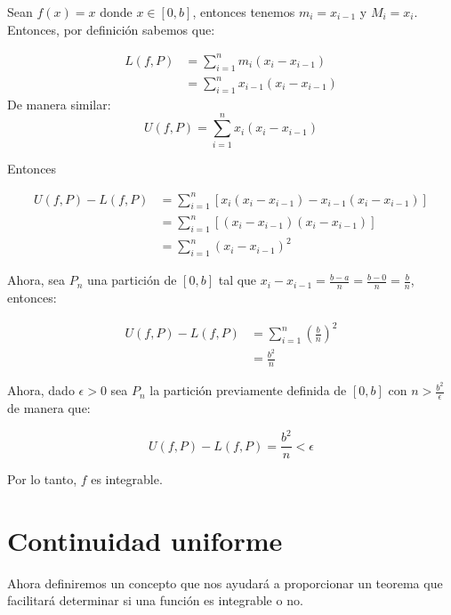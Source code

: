 \documentclass{report}
\begin{document}
    \begin{Example}
        Sean $f(x) = x$ donde $x \in [0,b]$, entonces tenemos $m_i = x_{i-1}$ y $M_i = x_i$. Entonces, por definición sabemos que:

        \begin{align*}
            L(f, P) &= \sum_{i=1}^{n} m_{i}(x_{i} - x_{i-1})\\
            &= \sum_{i=1}^{n}x_{i-1}(x_{i} - x_{i-1})
        \end{align*}
        De manera similar:
        $$U(f, P) = \sum_{i=1}^{n}x_{i}(x_{i} - x_{i-1})$$

        Entonces

        \begin{align*}
            U(f, P)- L(f, P) &= \sum_{i=1}^{n} \left[x_i(x_i-x_{i-1}) - x_{i-1}(x_i-x_{i-1})\right]\\
            &= \sum_{i=1}^{n} \left[(x_i-x_{i-1})(x_i-x_{i-1})\right]\\
            &= \sum_{i=1}^{n} (x_i-x_{i-1})^2
        \end{align*}

        Ahora, sea $P_n$ una partición de $[0,b]$ tal que $x_i - x_{i-1} = \frac{b-a}{n} = \frac{b-0}{n} = \frac{b}{n}$, entonces:

        \begin{align*}
            U(f, P)- L(f, P) &= \sum_{i=1}^{n} \left(\frac{b}{n}\right)^2\\
            &= \frac{b^2}{n}
        \end{align*}

        Ahora, dado $\epsilon > 0$ sea $P_n$ la partición previamente definida de $[0,b]$ con $n > \frac{b^2}{\epsilon}$ de manera que:

        $$U(f, P)- L(f, P) = \frac{b^2}{n} < \epsilon$$

        Por lo tanto, $f$ es integrable.

    \end{Example}


    \section{Continuidad uniforme}

    Ahora definiremos un concepto que nos ayudará a proporcionar un teorema que facilitará determinar si una función es integrable o no.
\end{document}
